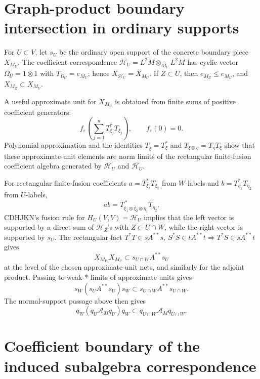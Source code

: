 \documentclass{article}
\begin{document}
\section*{Graph-product boundary intersection in ordinary supports}

For \(U\subset V\), let \(s_U\) be the ordinary open support of the concrete
boundary piece \(X_{M_U}\).  The coefficient correspondence
\(\mathcal H_U=L^2M\otimes_{M_U}L^2M\) has cyclic vector
\(\Omega_U=1\otimes1\) with \(T_{\Omega_U}=e_{M_U}\); hence
\(X_{\mathcal H_U}=X_{M_U}\).  If \(Z\subset U\), then
\(e_{M_Z}\le e_{M_U}\), and \(X_{M_Z}\subset X_{M_U}\).

A useful approximate unit for \(X_{M_U}\) is obtained from finite sums of
positive coefficient generators:
\[
        f_\varepsilon\left(\sum_{j=1}^n T_{\xi_j}^*T_{\xi_j}\right),
        \qquad f_\varepsilon(0)=0 .
\]
Polynomial approximation and the identities \(T_{\bar\xi}=T_\xi^*\) and
\(T_{\xi\otimes\eta}=T_\eta T_\xi\) show that these approximate-unit elements
are norm limits of the rectangular finite-fusion coefficient algebra generated by
\(\mathcal H_U\) and \(\overline{\mathcal H_U}\).

For rectangular finite-fusion coefficients
\(a=T_{\xi_1}^*T_{\xi_2}\) from \(W\)-labels and
\(b=T_{\eta_1}^*T_{\eta_2}\) from \(U\)-labels,
\[
        ab=T_{\xi_1\otimes\bar\xi_2\otimes\eta_1}^{\,*}T_{\eta_2}.
\]
CDHJKN's fusion rule for \(H_U(V,V)=\mathcal H_U\) implies that the left vector
is supported by a direct sum of \(\mathcal H_Z\)'s with
\(Z\subset U\cap W\), while the right vector is supported by \(s_U\).  The
rectangular fact \(T^*T\in sA^{**}s,\ S^*S\in tA^{**}t\Rightarrow
T^*S\in sA^{**}t\) gives
\[
        X_{M_W}X_{M_U}\subset s_{U\cap W}A^{**}s_U
\]
at the level of the chosen approximate-unit nets, and similarly for the
adjoint product.  Passing to weak-* limits of approximate units gives
\[
        s_W(s_UA^{**}s_U)s_W\subset s_{U\cap W}A^{**}s_{U\cap W}.
\]
The normal-support passage above then gives
\[
        q_W(q_U\mathcal A_Mq_U)q_W
        \subset q_{U\cap W}\mathcal A_Mq_{U\cap W}.
\]



\section*{Coefficient boundary of the induced subalgebra correspondence}
\end{document}
